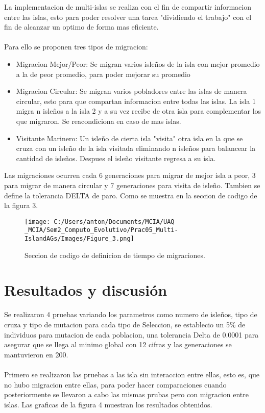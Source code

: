 \documentclass[10pt,letterpaper]{article}
\begin{document}
La implementacion de multi-islas se realiza con el fin de compartir informacion entre las islas, esto para poder resolver una tarea "dividiendo el trabajo" con el fin de alcanzar un optimo de forma mas eficiente.
\\\\
Para ello se proponen tres tipos de migracion:

\begin{itemize}
\item Migracion Mejor/Peor: Se migran varios isleños de la isla con mejor promedio a la de peor promedio, para poder mejorar su promedio

\item Migracion Circular: Se migran varios pobladores entre las islas de manera circular, esto para que compartan informacion entre todas las islas. La isla 1 migra n isleños a la isla 2 y a su vez recibe de otra isla para complementar los que migraron. Se reacondiciona en caso de mas islas.

\item Visitante Marinero: Un isleño de cierta isla "visita" otra isla en la que se cruza con un isleño de la isla visitada eliminando n isleños para balancear la cantidad de isleños. Despues el isleño visitante regresa a su isla.

\end{itemize}
Las migraciones ocurren cada 6 generaciones para migrar de mejor isla a peor, 3 para migrar de manera circular y 7 generaciones para visita de isleño. Tambien se define la tolerancia DELTA de paro. Como se muestra en la seccion de codigo de la figura 3.

\begin{figure}[H]
	\centering
    \texttt{[image: C:/Users/anton/Documents/MCIA/UAQ \_MCIA/Sem2\_Computo\_Evolutivo/Prac05\_Multi-IslandAGs/Images/Figure\_3.png]}
    \caption{Seccion de codigo de definicion de tiempo de migraciones.}
\end{figure}
\newpage
\section{Resultados y discusión}
Se realizaron 4 pruebas variando los parametros como numero de isleños, tipo de cruza y tipo de mutacion para cada tipo de Seleccion, se establecio un 5\% de individuos para mutacion de cada poblacion, una tolerancia Delta de 0.0001 para asegurar que se llega al minimo global con 12 cifras y las generaciones se mantuvieron en 200.
\\\\
Primero se realizaron las pruebas a las isla sin interaccion entre ellas, esto es, que no hubo migracion entre ellas, para poder hacer comparaciones cuando posteriormente se llevaron a cabo las mismas prubas pero con migracion entre islas. Las graficas de la figura 4 muestran los resultados obtenidos.
\end{document}
